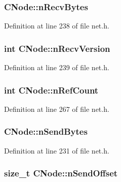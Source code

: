 \subsubsection[{n\+Recv\+Bytes}]{ C\+Node\+::n\+Recv\+Bytes}\label{class_c_node_a8bbe2a7052476d62acf7f0a5a9c5981b}


Definition at line 238 of file net.\+h.

\hypertarget{class_c_node_ab7494353448b922accfb645bd26ac271}{}
\subsubsection[{n\+Recv\+Version}]{\setlength{\rightskip}{0pt plus 5cm}int C\+Node\+::n\+Recv\+Version}\label{class_c_node_ab7494353448b922accfb645bd26ac271}


Definition at line 239 of file net.\+h.

\hypertarget{class_c_node_a01f8cac776bef676651f9b8f3f80ae98}{}
\subsubsection[{n\+Ref\+Count}]{\setlength{\rightskip}{0pt plus 5cm}int C\+Node\+::n\+Ref\+Count}\label{class_c_node_a01f8cac776bef676651f9b8f3f80ae98}


Definition at line 267 of file net.\+h.

\hypertarget{class_c_node_a33e24a9544df3c60f9e1ec05b5e91051}{}
\subsubsection[{n\+Send\+Bytes}]{ C\+Node\+::n\+Send\+Bytes}\label{class_c_node_a33e24a9544df3c60f9e1ec05b5e91051}


Definition at line 231 of file net.\+h.

\hypertarget{class_c_node_a090bda86de6b84c3db83e1f029d4f453}{}
\subsubsection[{n\+Send\+Offset}]{\setlength{\rightskip}{0pt plus 5cm}size\+\_\+t C\+Node\+::n\+Send\+Offset}\label{class_c_node_a090bda86de6b84c3db83e1f029d4f453}


